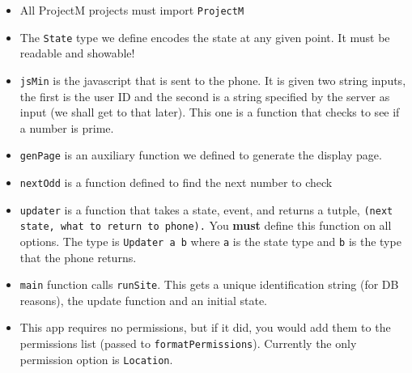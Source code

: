 \documentclass{article}
\begin{document}
\begin{itemize}
  \item{All ProjectM projects must import \texttt{ProjectM}}
  \item{The \texttt{State} type we define encodes the state at any given point. It must be readable and showable!}
  \item{\texttt{jsMin} is the javascript that is sent to the phone. It is given two string inputs, the first is the user ID and the second is
    a string specified by the server as input (we shall get to that later). This one is a function that checks to see if a number is prime.}
  \item{\texttt{genPage} is an auxiliary function we defined to generate the display page.}
  \item{\texttt{nextOdd} is a function defined to find the next number to check}
  \item{\texttt{updater} is a function that takes a state, event, and returns a tutple, \texttt{(next state, what to return to phone).} You \textbf{must} 
    define this function on all options. The type is \texttt{Updater a b} where \texttt{a} is the state type and \texttt{b} is the type that the phone returns.}
  \item{\texttt{main} function calls \texttt{runSite}. This gets a unique identification string (for DB reasons), the update function and an initial state.}
  \item{This app requires no permissions, but if it did, you would add them to the permissions list (passed to \texttt{formatPermissions}). Currently the only permission
    option is \texttt{Location}.}
\end{itemize}
\end{document}
